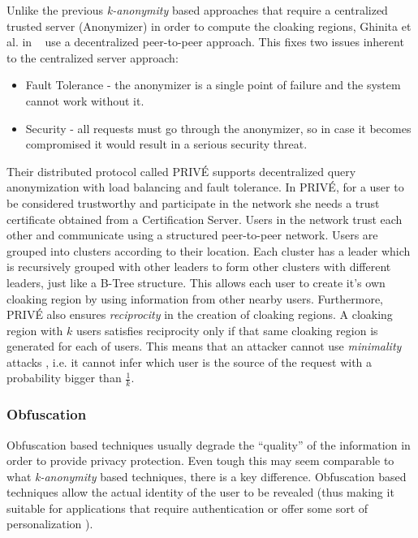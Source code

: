Unlike the previous \emph{k-anonymity} based approaches that require a
centralized trusted server (Anonymizer) in order to compute the cloaking
regions, Ghinita et al. in ~\cite{ghinita2007prive} use a
decentralized peer-to-peer approach. This fixes two issues inherent to
the centralized server approach: 
\begin{itemize}
\item Fault Tolerance -  the
anonymizer is a single point of failure and the system cannot work
without it.
\item Security - all requests must go through the anonymizer, so in
  case it becomes compromised it would result in a serious security
  threat.
\end{itemize}
Their distributed protocol called PRIVÉ supports decentralized query
anonymization with load balancing and fault tolerance. In PRIVÉ, for a
user to be considered trustworthy and participate in the network she
needs a trust certificate obtained from a Certification Server. Users
in the network trust each other and communicate using a structured
peer-to-peer network. Users are grouped into clusters according to
their location. Each cluster has a leader which is recursively grouped
with other leaders to form other clusters with different leaders, just
like a B-Tree structure. This allows each user to create it's own
cloaking region by using information from other nearby users.
Furthermore, PRIVÉ also ensures \emph{reciprocity} in the creation of
cloaking regions. A cloaking region with $k$ users satisfies
reciprocity only if that same cloaking region is generated for each of
users. This means that an attacker cannot use \emph{minimality} attacks
\cite{wong2007minimality}, i.e. it cannot infer which user is the
source of the request with a probability bigger than $\frac{1}{k}$.

\subsubsection{Obfuscation}
\label{sec:Obfuscation}

Obfuscation based techniques usually degrade the ``quality'' of the
information in order to provide privacy protection. Even tough this may
seem comparable to what \emph{k-anonymity} based techniques, there is a
key difference. Obfuscation based techniques allow the actual identity
of the user to be revealed (thus making it suitable for applications
that require authentication or offer some sort of  personalization
\cite{langheinrich2001privacy}).


